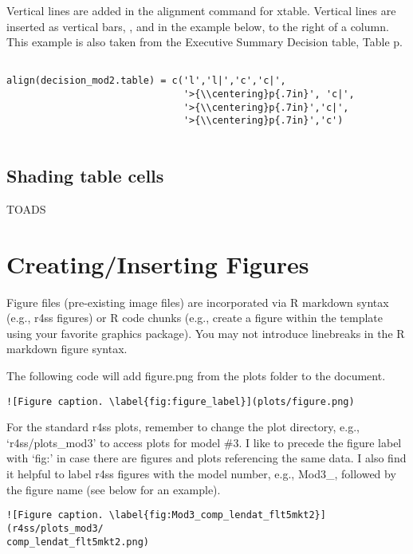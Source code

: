 \documentclass[12pt,]{article}
\begin{document}
Vertical lines are added in the alignment command for xtable. Vertical
lines are inserted as vertical bars, \textbar{}, and in the example
below, to the right of a column. This example is also taken from the
Executive Summary Decision table, Table p.

\begin{Verbatim}[frame=single]

align(decision_mod2.table) = c('l','l|','c','c|',
                               '>{\\centering}p{.7in}', 'c|',
                               '>{\\centering}p{.7in}','c|',
                               '>{\\centering}p{.7in}','c') 
                               
\end{Verbatim}

\subsection{Shading table cells}\label{shading-table-cells}

TOADS

\section{Creating/Inserting Figures}\label{creatinginserting-figures}

Figure files (pre-existing image files) are incorporated via R markdown
syntax (e.g., r4ss figures) or R code chunks (e.g., create a figure
within the template using your favorite graphics package). You may not
introduce linebreaks in the R markdown figure syntax.

The following code will add figure.png from the plots folder to the
document.

\begin{Verbatim}[frame=single]
![Figure caption. \label{fig:figure_label}](plots/figure.png)
\end{Verbatim}

For the standard r4ss plots, remember to change the plot directory,
e.g., `r4ss/plots\_mod3' to access plots for model \#3. I like to
precede the figure label with `fig:' in case there are figures and plots
referencing the same data. I also find it helpful to label r4ss figures
with the model number, e.g., Mod3\_, followed by the figure name (see
below for an example).

\begin{Verbatim}[frame=single]
![Figure caption. \label{fig:Mod3_comp_lendat_flt5mkt2}](r4ss/plots_mod3/
comp_lendat_flt5mkt2.png)
\end{Verbatim}
\end{document}
